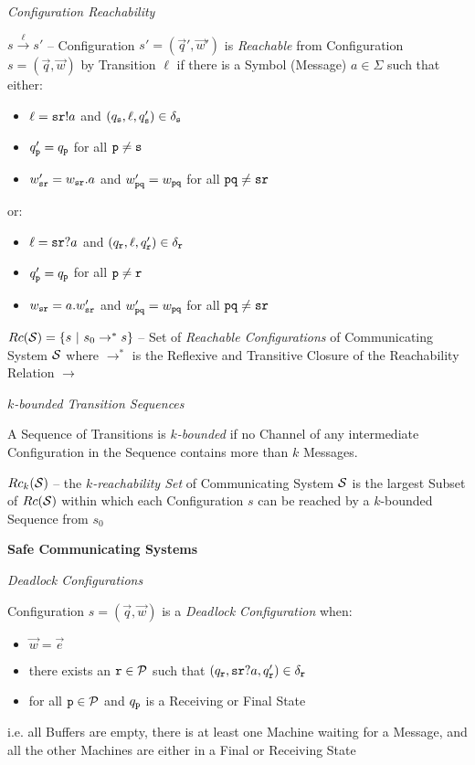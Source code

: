 \emph{Configuration Reachability}

$s \xrightarrow{\ell} s'$ -- Configuration $s' = (\vec{q}',\vec{w}')$
is \emph{Reachable} from Configuration $s = (\vec{q},\vec{w})$ by
Transition $\ell$ if there is a Symbol (Message) $a \in \Sigma$ such
that either:
\begin{itemize}
  \item $\ell = \mathtt{sr}!a$ and $(q_\mathtt{s},\ell,q_\mathtt{s}') \in
    \delta_\mathtt{s}$
  \item $q_\mathtt{p}' = q_\mathtt{p}$ for all $\mathtt{p \neq s}$
  \item $w_\mathtt{sr}' = w_\mathtt{sr}.a$ and $w_\mathtt{pq}' =
    w_\mathtt{pq}$ for all $\mathtt{pq \neq sr}$
\end{itemize}
or:
\begin{itemize}
  \item $\ell = \mathtt{sr}?a$ and $(q_\mathtt{r},\ell,q_\mathtt{r}') \in
    \delta_\mathtt{r}$
  \item $q_\mathtt{p}' = q_\mathtt{p}$ for all $\mathtt{p \neq r}$
  \item $w_\mathtt{sr} = a.w_\mathtt{sr}'$ and $w_\mathtt{pq}' =
    w_\mathtt{pq}$ for all $\mathtt{pq \neq sr}$
\end{itemize}

$Rc(\mathcal{S}) = \{ s \ |\ s_0 \rightarrow^* s \}$ -- Set of
\emph{Reachable Configurations} of Communicating System $\mathcal{S}$
where $\rightarrow^*$ is the Reflexive and Transitive Closure of the
Reachability Relation $\rightarrow$

\emph{$k$-bounded Transition Sequences}

A Sequence of Transitions is \emph{$k$-bounded} if no Channel of any
intermediate Configuration in the Sequence contains more than $k$
Messages.

$Rc_k(\mathcal{S})$ -- the \emph{$k$-reachability Set} of Communicating
System $\mathcal{S}$ is the largest Subset of $Rc(\mathcal{S})$ within
which each Configuration $s$ can be reached by a $k$-bounded Sequence
from $s_0$


\textbf{Safe Communicating Systems}

\emph{Deadlock Configurations}

Configuration $s = (\vec{q},\vec{w})$ is a \emph{Deadlock
  Configuration} when:
\begin{itemize}
  \item $\vec{w} = \vec{e}$
  \item there exists an $\mathtt{r} \in \mathcal{P}$ such that
    $(q_\mathtt{r},\mathtt{sr}?a,q_\mathtt{r}') \in \delta_\mathtt{r}$
  \item for all $\mathtt{p} \in \mathcal{P}$ and $q_\mathtt{p}$ is a
    Receiving or Final State
\end{itemize}
i.e. all Buffers are empty, there is at least one Machine waiting for
a Message, and all the other Machines are either in a Final or
Receiving State

